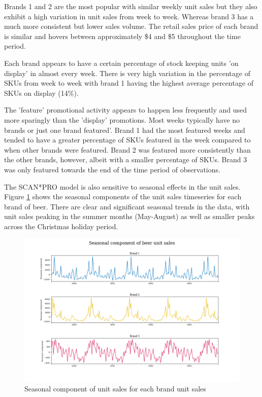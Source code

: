 \documentclass[a4paper,11pt]{article}
\begin{document}
Brands 1 and 2 are the most popular with similar weekly unit sales but they also exhibit a high variation in unit sales from week to week. Whereas brand 3 has a much more consistent but lower sales volume. The retail sales price of each brand is similar and hovers between approximately \$4 and \$5 throughout the time period. 

Each brand appears to have a certain percentage of stock keeping units 'on display' in almost every week. There is very high variation in the percentage of SKUs from week to week with brand 1 having the highest average percentage of SKUs on display (14\%).

The 'feature' promotional activity appears to happen less frequently and used more sparingly than the 'display' promotions. Most weeks typically have no brands or just one brand featured'. Brand 1 had the most featured weeks and tended to have a greater percentage of SKUs featured in the week compared to when other brands were featured. Brand 2 was featured more consistently than the other brands, however, albeit with a smaller percentage of SKUs. Brand 3 was only featured towards the end of the time period of observations. 

The SCAN*PRO model is also sensitive to seasonal effects in the unit sales. Figure \ref{fig:seasonal-plots} shows the seasonal components of the unit sales timeseries for each brand of beer. There are clear and significant seasonal trends in the data, with unit sales peaking in the summer months (May-August) as well as smaller peaks across the Christmas holiday period.


\begin{figure}
  \centering
  \includegraphics[scale=0.38]{seasonal_plots}
  \caption{Seasonal component of unit sales for each brand unit sales}\label{fig:seasonal-plots}
\end{figure}
\end{document}
